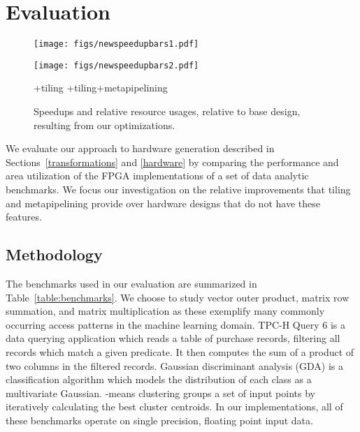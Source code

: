 \documentclass[pageno]{jpaper}
\begin{document}
 \section{Evaluation}
\label{evaluation}




\begin{figure*}[ht]
\centering


\texttt{[image: figs/newspeedupbars1.pdf]}

\vspace{-10pt}

\texttt{[image: figs/newspeedupbars2.pdf]}

{
\selectfont
\footnotesize
{}
+tiling
\hspace{2em}
+tiling+metapipelining
}

\caption{Speedups and relative resource usages, relative to base design, resulting from our optimizations.}
\label{fig:speedup-bars}
\end{figure*}

We evaluate our approach to hardware generation described in Sections~\ref{transformations} and \ref{hardware} by comparing the performance and
area utilization of the FPGA implementations of a set of data analytic benchmarks.
We focus our investigation on the relative improvements that tiling and metapipelining provide over hardware designs that do not have these features.

\subsection{Methodology}
The benchmarks used in our evaluation are summarized in Table~\ref{table:benchmarks}.
We choose to study vector outer product, matrix row summation, and matrix multiplication as these exemplify many commonly occurring access patterns in the machine learning domain.
TPC-H Query 6 is a data querying application which reads a table of purchase records, filtering all
records which match a given predicate. It then computes the sum of a product of two columns in the filtered records.
Gaussian discriminant analysis (GDA) is a classification algorithm which models the distribution of each class as a multivariate Gaussian.
-means clustering groups a set of input points by iteratively calculating the  best cluster centroids.
In our implementations, all of these benchmarks operate on single precision, floating point input data.
\end{document}
